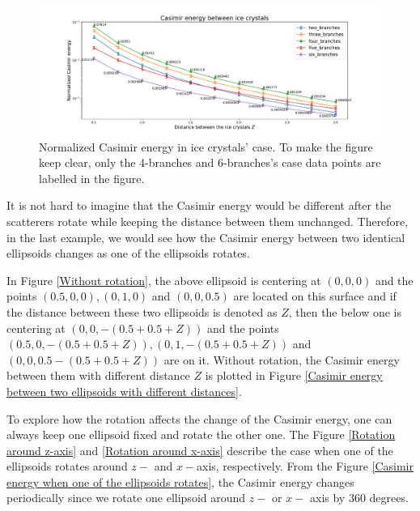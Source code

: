     \begin{figure}[H]
        \centering
        \hspace*{-1cm}\includegraphics[scale = 0.5]{figures/CasE_ice_crystals.pdf}
        \caption{Normalized Casimir energy in ice crystals' case. To make the figure keep clear, only the 4-branches and 6-branches's case data points 
        are labelled in the figure.}
        \label{Normalized Casimir energy in ice crystals' case}
    \end{figure}


It is not hard to imagine that the Casimir energy would be different after the scatterers rotate while keeping the distance between them unchanged. Therefore, 
in the last example, we would see how the Casimir energy between two identical ellipsoids changes as one of the ellipsoids rotates.

In Figure \ref{Without rotation}, the above ellipsoid is centering at $(0,0,0)$ and 
the points $(0.5, 0, 0), (0, 1, 0)$ and $(0, 0, 0.5)$ are located on this surface and if the distance between these two ellipsoids is denoted as $Z$, then the below one
is centering at $(0, 0, -(0.5+0.5+Z))$ and the points $(0.5, 0, -(0.5+0.5+Z)), (0, 1, -(0.5+0.5+Z))$ and $(0, 0, 0.5-(0.5+0.5+Z))$ are on it. Without rotation, 
the Casimir energy between them with different distance $Z$ is plotted in Figure \ref{Casimir energy between two ellipsoids with different distances}.

To explore how the rotation affects the change of the Casimir energy, one can always keep one ellipsoid fixed and rotate the other one. The Figure 
\ref{Rotation around z-axis} and \ref{Rotation around x-axis} describe the case when one of the ellipsoids rotates around $z-$ and $x-$axis, respectively.
From the Figure \ref{Casimir energy when one of the ellipsoids rotates}, the Casimir energy changes periodically since we rotate one ellipsoid around 
$z-$ or $x-$ axis by 360 degrees. 


